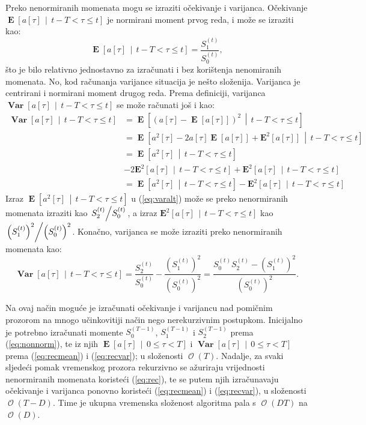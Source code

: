 \documentclass[lmodern, utf8, diplomski, numeric]{fer}
\newcommand{\E}[1]{\operatorname{\mathbf{E}}\q[#1\w]}
\newcommand{\Esq}[1]{\operatorname{\mathbf{E}^2}\q[#1\w]}
\newcommand{\Efromto}[2]{\operatorname{\mathbf{E}}\q[#1\, \middle\vert\, #2\w]}
\newcommand{\Esqfromto}[2]{\operatorname{\mathbf{E}^2}\q[#1\, \middle\vert\, #2\w]}
\newcommand{\Varfromto}[2]{\operatorname{\mathbf{Var}}\q[#1\, \middle\vert\, #2\w]}
\newcommand{\bigO}[1]{\operatorname{\mathcal{O}}\q(#1\w)}
\newcommand{\q}{\left}
\newcommand{\w}{\right}
\begin{document}
  Preko nenormiranih momenata mogu se izraziti očekivanje i varijanca.
  Očekivanje $\Efromto{a\q[\tau\w]}{t - T < \tau \le t}$ je normirani moment prvog reda, i može se izraziti kao:
  \begin{equation}
  \label{eq:recmean}
  \Efromto{a\q[\tau\w]}{t - T < \tau \le t} = \frac{S_1^{(t)}}{S_0^{(t)}},
  \end{equation}
  što je bilo relativno jednostavno za izračunati i bez korištenja nenomiranih momenata.
  No, kod računanja varijance situacija je nešto složenija.
  Varijanca je centrirani i normirani moment drugog reda.
  Prema definiciji, varijanca $\Varfromto{a\q[\tau\w]}{t - T < \tau \le t}$ se može računati još i kao:
  \begin{align}
    \Varfromto{a\q[\tau\w]}{t - T < \tau \le t} &= \Efromto{\q(a\q[\tau\w] - \E{a\q[\tau\w]} \w)^2}{t - T < \tau \le t} \nonumber \\
    &= \Efromto{a^2\q[\tau\w] - 2 a\q[\tau\w] \E{a\q[\tau\w]} + \Esq{a\q[\tau\w]}}{t - T < \tau \le t} \nonumber \\
    &= \Efromto{a^2\q[\tau\w]}{t - T < \tau \le t} \nonumber \\
    & - 2\Esqfromto{a\q[\tau\w]}{t - T < \tau \le t} + \Esqfromto{a\q[\tau\w]}{t - T < \tau \le t} \nonumber \\
    \label{eq:varalt}
    &= \Efromto{a^2\q[\tau\w]}{t - T < \tau \le t} - \Esqfromto{a\q[\tau\w]}{t - T < \tau \le t}
  \end{align}
  Izraz $\Efromto{a^2\q[\tau\w]}{t - T < \tau \le t}$ u (\ref{eq:varalt}) može se preko nenormiranih momenata izraziti kao $\q. S_2^{(t)} \middle/ S_0^{(t)} \w.$,
  a izraz $\Esqfromto{a\q[\tau\w]}{t - T < \tau \le t}$ kao $\q. \q(S_1^{(t)}\w)^2 \middle/ \q(S_0^{(t)}\w)^2 \w.$.
  Konačno, varijanca se može izraziti preko nenormiranih momenata kao:
  \begin{equation}
    \label{eq:recvar}
    \Varfromto{a\q[\tau\w]}{t - T < \tau \le t} = \frac{S_2^{(t)}}{S_0^{(t)}} - \frac{\q(S_1^{(t)}\w)^2}{\q(S_0^{(t)}\w)^2}
    = \frac{S_0^{(t)} S_2^{(t)} - \q(S_1^{(t)}\w)^2}{\q(S_0^{(t)}\w)^2}.
  \end{equation}
  
  Na ovaj način moguće je izračunati očekivanje i varijancu nad pomičnim prozorom na mnogo učinkovitiji način nego nerekurzivnim postupkom.
  Inicijalno je potrebno izračunati momente $S_0^{(T - 1)}$, $S_1^{(T - 1)} $ i $S_2^{(T - 1)}$ prema (\ref{eq:nonnorm}), te iz njih $\Efromto{a\q[\tau\w]}{0 \le \tau < T}$ i $\Varfromto{a\q[\tau\w]}{0 \le \tau < T}$ prema (\ref{eq:recmean}) i (\ref{eq:recvar}); u složenosti $\bigO{T}$.
  Nadalje, za svaki sljedeći pomak vremenskog prozora rekurzivno se ažuriraju vrijednosti nenormiranih momenata koristeći (\ref{eq:rec}), te se putem njih izračunavaju očekivanje i varijanca ponovno koristeći (\ref{eq:recmean}) i (\ref{eq:recvar}), u složenosti $\bigO{T - D}$.
  Time je ukupna vremenska složenost algoritma pala s $\bigO{DT}$ na $\bigO{D}$.
\end{document}
